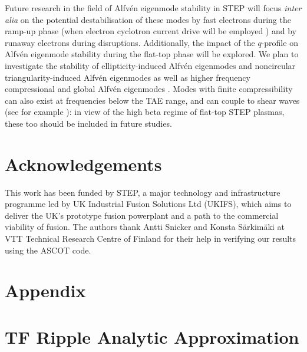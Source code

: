\documentclass[10pt, a4paper, twoside]{article}
\begin{document}
Future research in the field of Alfv\'en eigenmode stability in STEP will focus {\it inter alia} on the potential destabilisation of these modes by fast electrons during the ramp-up phase (when electron cyclotron current drive will be employed \cite{Henderson2024}) and by runaway electrons during disruptions. Additionally, the impact of the $q$-profile on Alfv\'en eigenmode stability during the flat-top phase will be explored. We plan to investigate the stability of ellipticity-induced Alfv\'en eigenmodes and noncircular triangularity-induced Alfv\'en eigenmodes \cite{betti1992} as well as higher frequency compressional and global Alfv\'en eigenmodes \cite{Gorelenkov2016}. Modes with finite compressibility can also exist at frequencies below the TAE range, and can couple to shear waves (see for example \cite{Gorelenkov2007}): in view of the high beta regime of flat-top STEP plasmas, these too should be included in future studies. 




\section*{Acknowledgements}

This work has been funded by STEP, a major technology and infrastructure programme led by UK Industrial Fusion Solutions Ltd (UKIFS), which aims to deliver the UK’s prototype fusion powerplant and a path to the commercial viability of fusion. The authors thank Antti Snicker and Konsta S\"arkim\"aki at VTT Technical Research Centre of Finland for their help in verifying our results using the ASCOT code.

\section*{Appendix}

\appendix

\section{TF Ripple Analytic Approximation}
\label{appendix:tf_ripple_analytic_approximation}
\end{document}
